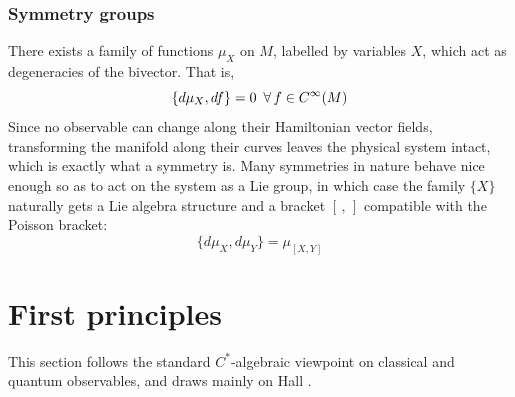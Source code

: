 \documentclass[
  12pt,
  a4paper, oneside
]{report}
\theoremstyle{bolddef}
\theoremstyle{remark}
\numberwithin{equation}{chapter}
\begin{document}
\subsubsection{Symmetry groups}
There exists a family of functions $\mu_{X}$ on $M$, labelled by variables $X$, which act as degeneracies of the bivector. That is,
$$
\{d\mu_{X},df\} = 0 \enskip \forall \, f \in C^{\infty}(M)
$$
Since no observable can change along their Hamiltonian vector fields, transforming the manifold along their curves leaves the
physical system intact, which is exactly what a symmetry is. Many symmetries in nature behave nice enough
so as to act on the system as a Lie group, in which case the family $\{ X \}$ naturally gets a Lie algebra structure and a bracket $[\,,\,]$   compatible with the 
Poisson bracket: 
$$  
\{ d\mu_{X},d\mu_{Y} \} = \mu_{[X,Y]}
$$

\section{First principles}
This section follows the standard $C^*$-algebraic viewpoint on classical and quantum observables, and draws mainly on Hall \cite{Hall2013}.
\end{document}
